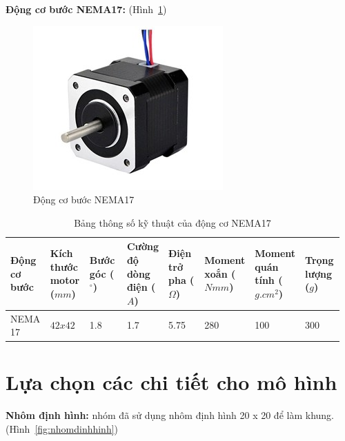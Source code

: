 \textbf{Động cơ bước NEMA17:} (Hình~\ref{fig:nema17})
\begin{center}
    \begin{figure}[htp]
    \begin{center}
     \includegraphics[scale=1]{Chapters/Chapter3/Images/NEMA17}
    \end{center}
    \caption{Động cơ bước NEMA17}
    \label{fig:nema17}
    \end{figure}
\end{center}
\begin{table}[H]
\centering
\begin{tabular}{|p{0.12\linewidth}|p{0.12\linewidth}|p{0.12\linewidth}|p{0.12\linewidth}|p{0.12\linewidth}|p{0.12\linewidth}|p{0.12\linewidth}|p{0.12\linewidth}|}
\hline 
Động cơ bước & Kích thước motor ($mm$) & Bước góc ($^{\circ}$) & Cường độ dòng điện ($A$) & Điện trở pha ($\Omega$) & Moment xoắn ($Nmm$) & Moment quán tính ($g.cm^2$) & Trọng lượng ($g$) \\
\hline 
NEMA 17 & $42x42$ & 1.8 & 1.7 & 5.75 & 280 & 100 & 300 \\
\hline 
\end{tabular} 
\caption{Bảng thông số kỹ thuật của động cơ NEMA17}
\label{tab:NEMA17}
\end{table}

\section{Lựa chọn các chi tiết cho mô hình}

\textbf{Nhôm định hình:} nhóm đã sử dụng nhôm định hình 20 x 20 để làm khung. (Hình~\ref{fig:nhomdinhhinh})

